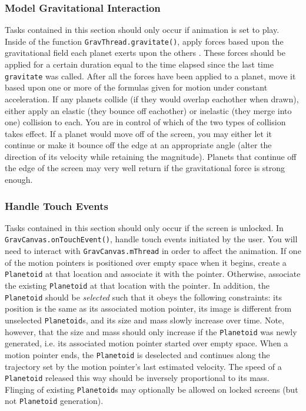 \subsubsection{Model Gravitational Interaction}
Tasks contained in this section should only occur if animation is set to play.
Inside of the function \verb=GravThread.gravitate()=, apply forces based upon the gravitational field each planet exerts upon the others .
These forces should be applied for a certain duration equal to the time elapsed since the last time \verb=gravitate= was called.
After all the forces have been applied to a planet, move it based upon one or more of the formulas given for motion under constant acceleration.
If any planets collide (if they would overlap eachother when drawn), either apply an elastic (they bounce off eachother) or inelastic (they merge into one) collision to each.
You are in control of which of the two types of collision takes effect.
If a planet would move off of the screen, you may either let it continue or make it bounce off the edge at an appropriate angle (alter the direction of its velocity while retaining the magnitude).
Planets that continue off the edge of the screen may very well return if the gravitational force is strong enough.

\subsubsection{Handle Touch Events}
Tasks contained in this section should only occur if the screen is unlocked.
In \verb=GravCanvas.onTouchEvent()=, handle touch events initiated by the user.
You will need to interact with \verb=GravCanvas.mThread= in order to affect the animation.
If one of the motion pointers is positioned over empty space when it begins, create a \verb=Planetoid= at that location and associate it with the pointer.
Otherwise, associate the existing \verb=Planetoid= at that location with the pointer.
In addition, the \verb=Planetoid= should be {\em selected} such that it obeys the following constraints: its position is the same as its associated motion pointer, its image is different from unselected \verb=Planetoid=s, and its size and mass slowly increase over time.
Note, however, that the size and mass should only increase if the \verb=Planetoid= was newly generated, i.e. its associated motion pointer started over empty space.
When a motion pointer ends, the \verb=Planetoid= is deselected and continues along the trajectory set by the motion pointer's last estimated velocity. 
The speed of a \verb=Planetoid= released this way should be inversely proportional to its mass.
Flinging of existing \verb=Planetoid=s  may optionally be allowed on locked screens (but not \verb=Planetoid= generation).

